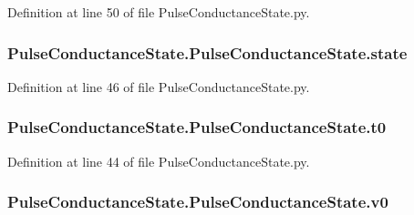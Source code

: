 Definition at line 50 of file Pulse\-Conductance\-State.\-py.

\hypertarget{class_pulse_conductance_state_1_1_pulse_conductance_state_ac85aa714a187088e1b31fa2369ed4bca}{
\subsubsection[{state}]{\setlength{\rightskip}{0pt plus 5cm}Pulse\-Conductance\-State.\-Pulse\-Conductance\-State.\-state}}\label{class_pulse_conductance_state_1_1_pulse_conductance_state_ac85aa714a187088e1b31fa2369ed4bca}


Definition at line 46 of file Pulse\-Conductance\-State.\-py.

\hypertarget{class_pulse_conductance_state_1_1_pulse_conductance_state_a55f44caf230fc3899811924118705f56}{
\subsubsection[{t0}]{\setlength{\rightskip}{0pt plus 5cm}Pulse\-Conductance\-State.\-Pulse\-Conductance\-State.\-t0}}\label{class_pulse_conductance_state_1_1_pulse_conductance_state_a55f44caf230fc3899811924118705f56}


Definition at line 44 of file Pulse\-Conductance\-State.\-py.

\hypertarget{class_pulse_conductance_state_1_1_pulse_conductance_state_a215539a3eb60e280225053c83f386d79}{
\subsubsection[{v0}]{\setlength{\rightskip}{0pt plus 5cm}Pulse\-Conductance\-State.\-Pulse\-Conductance\-State.\-v0}}\label{class_pulse_conductance_state_1_1_pulse_conductance_state_a215539a3eb60e280225053c83f386d79}


